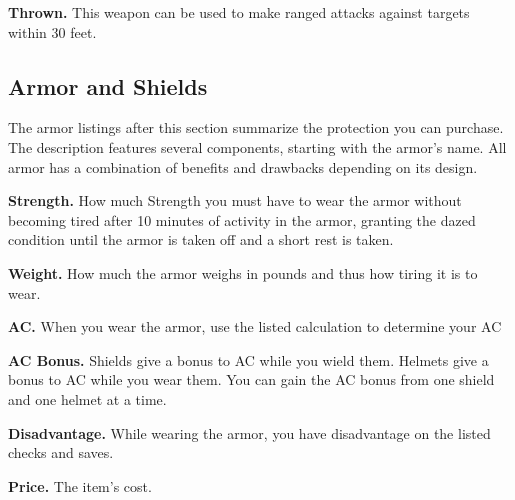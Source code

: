 \documentclass[12pt,letterpaper,twocolumn,openany,nodeprecatedcode,bg=none]{dndbook}
\let\oldsubsection\subsection
\renewcommand{\subsection}[1]{%
  \needspace{5\baselineskip}%
  \oldsubsection{#1}%
}
\begin{document}
\textbf{Thrown.} This weapon can be used to make ranged attacks against
targets within 30 feet.

\subsection{Armor and Shields}\label{armor-and-shields}

The armor listings after this section summarize the protection you can
purchase. The description features several components, starting with the
armor's name. All armor has a combination of benefits and drawbacks
depending on its design.

\textbf{Strength.} How much Strength you must have to wear the armor
without becoming tired after 10 minutes of activity in the armor,
granting the dazed condition until the armor is taken off and a short
rest is taken.

\textbf{Weight.} How much the armor weighs in pounds and thus how tiring
it is to wear.

\textbf{AC.} When you wear the armor, use the listed calculation to
determine your AC

\textbf{AC Bonus.} Shields give a bonus to AC while you wield them.
Helmets give a bonus to AC while you wear them. You can gain the AC
bonus from one shield and one helmet at a time.

\textbf{Disadvantage.} While wearing the armor, you have disadvantage on
the listed checks and saves.

\textbf{Price.} The item's cost.

\end{document}
